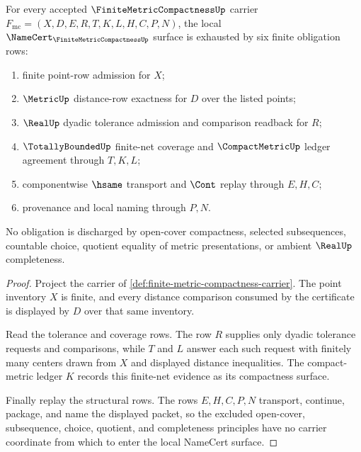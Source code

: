 \begin{theorem}
\label{thm:finite-metric-compactness-namecert-obligations}
For every accepted $\FiniteMetricCompactnessUp$ carrier $F_{\mathrm{mc}}=(X,D,E,R,T,K,L,H,C,P,N)$, the local $\NameCert_{\FiniteMetricCompactnessUp}$ surface is exhausted by six finite obligation rows:
\begin{enumerate}
  \item finite point-row admission for $X$;
  \item $\MetricUp$ distance-row exactness for $D$ over the listed points;
  \item $\RealUp$ dyadic tolerance admission and comparison readback for $R$;
  \item $\TotallyBoundedUp$ finite-net coverage and $\CompactMetricUp$ ledger agreement through $T,K,L$;
  \item componentwise $\hsame$ transport and $\Cont$ replay through $E,H,C$;
  \item provenance and local naming through $P,N$.
\end{enumerate}
No obligation is discharged by open-cover compactness, selected subsequences, countable choice, quotient equality of metric presentations, or ambient $\RealUp$ completeness.
\end{theorem}
\begin{proof}
Project the carrier of \autoref{def:finite-metric-compactness-carrier}. The point inventory $X$ is finite, and every distance comparison consumed by the certificate is displayed by $D$ over that same inventory.

Read the tolerance and coverage rows. The row $R$ supplies only dyadic tolerance requests and comparisons, while $T$ and $L$ answer each such request with finitely many centers drawn from $X$ and displayed distance inequalities. The compact-metric ledger $K$ records this finite-net evidence as its compactness surface.

Finally replay the structural rows. The rows $E,H,C,P,N$ transport, continue, package, and name the displayed packet, so the excluded open-cover, subsequence, choice, quotient, and completeness principles have no carrier coordinate from which to enter the local NameCert surface.
\end{proof}

